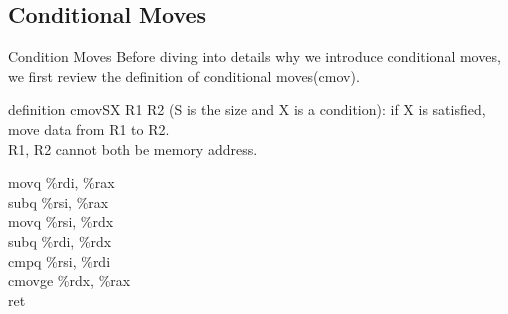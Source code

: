 \documentclass{beamer}
\begin{document}
        \subsection{Conditional Moves}
        \begin{frame}{Condition Moves}
            Before diving into details why we introduce conditional moves, we first review the definition of conditional moves(cmov).
            \begin{block}{definition}
                cmovSX R1 R2 (S is the size and X is a condition): if X is satisfied, move data from R1 to R2.\\
                R1, R2 cannot both be memory address.
            \end{block}
            \begin{example}
                movq \%rdi, \%rax\\
                subq \%rsi, \%rax\\
                movq \%rsi, \%rdx\\
                subq \%rdi, \%rdx\\ 
                cmpq \%rsi, \%rdi\\
                cmovge \%rdx, \%rax\\
                ret
            \end{example}
        \end{frame}
\end{document}
